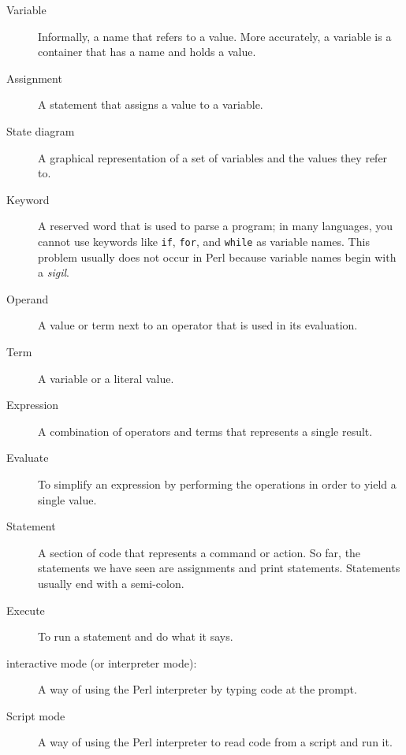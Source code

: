 \begin{description}

\item[Variable]  Informally, a name that refers to a value. More 
accurately, a variable is a container that has a name and holds a value.

\item[Assignment]  A statement that assigns a value to a variable.

\item[State diagram]  A graphical representation of a set of variables and the
values they refer to.

\item[Keyword]  A reserved word that is used to parse a
program; in many languages, you cannot use keywords like 
{\tt if}, {\tt  for}, and {\tt while} as variable names. 
This problem usually does not occur in Perl because variable
names begin with a \emph{sigil}.

\item[Operand] A value or term next to an operator that 
is used in its evaluation.

\item[Term]  A variable or a literal value.

\item[Expression]  A combination of operators and terms that
represents a single result.

\item[Evaluate]  To simplify an expression by performing the operations
in order to yield a single value.

\item[Statement]  A section of code that represents a command or action.  So
far, the statements we have seen are assignments and print statements. Statements usually end with a semi-colon.

\item[Execute]  To run a statement and do what it says.

\item[interactive mode (or interpreter mode):] A way of using the Perl 
interpreter by typing code at the prompt.

\item[Script mode] A way of using the Perl interpreter to read
code from a script and run it.


\end{description}
